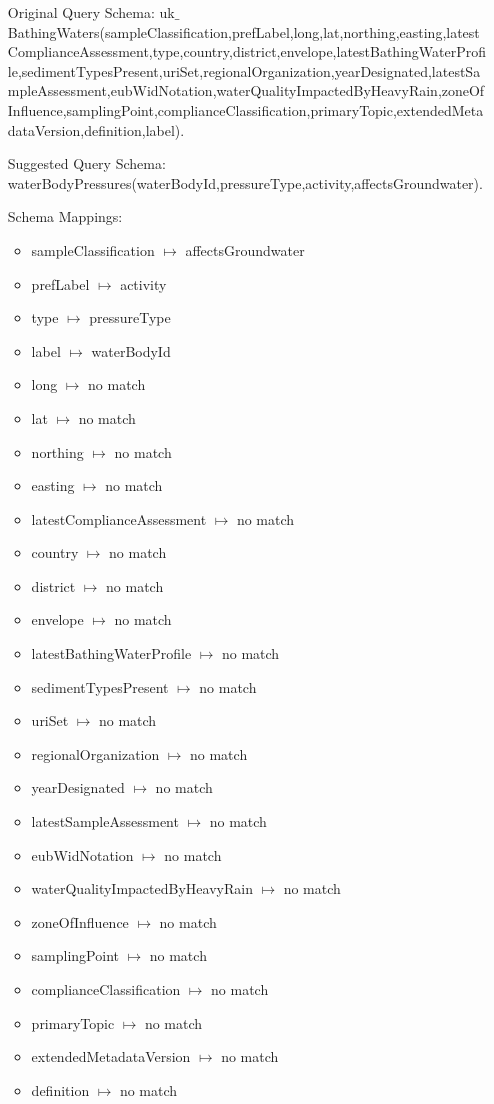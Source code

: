 \documentclass[a4paper,10pt]{article}
\begin{document}
\begin{itemize}
\item[Original Query Schema:] uk$\_$BathingWaters(sampleClassification,prefLabel,long,lat,northing,easting,latestComplianceAssessment,type,country,district,envelope,latestBathingWaterProfile,sedimentTypesPresent,uriSet,regionalOrganization,yearDesignated,latestSampleAssessment,eubWidNotation,waterQualityImpactedByHeavyRain,zoneOfInfluence,samplingPoint,complianceClassification,primaryTopic,extendedMetadataVersion,definition,label).


\item[Suggested Query Schema: ]
waterBodyPressures(waterBodyId,pressureType,activity,affectsGroundwater).

\item[Schema Mappings:] 
	\begin{itemize}

\item sampleClassification $\mapsto$ affectsGroundwater
\item prefLabel $\mapsto$ activity
\item type $\mapsto$ pressureType
\item label $\mapsto$ waterBodyId
\item long $\mapsto$ no match 
\item lat $\mapsto$ no match 
\item northing $\mapsto$ no match 
\item easting $\mapsto$ no match 
\item latestComplianceAssessment $\mapsto$ no match 
\item country $\mapsto$ no match 
\item district $\mapsto$ no match 
\item envelope $\mapsto$ no match 
\item latestBathingWaterProfile $\mapsto$ no match 
\item sedimentTypesPresent $\mapsto$ no match 
\item uriSet $\mapsto$ no match 
\item regionalOrganization $\mapsto$ no match 
\item yearDesignated $\mapsto$ no match 
\item latestSampleAssessment $\mapsto$ no match 
\item eubWidNotation $\mapsto$ no match 
\item waterQualityImpactedByHeavyRain $\mapsto$ no match 
\item zoneOfInfluence $\mapsto$ no match 
\item samplingPoint $\mapsto$ no match 
\item complianceClassification $\mapsto$ no match 
\item primaryTopic $\mapsto$ no match 
\item extendedMetadataVersion $\mapsto$ no match 
\item definition $\mapsto$ no match 
	\end{itemize}

\end{itemize}
\end{document}
